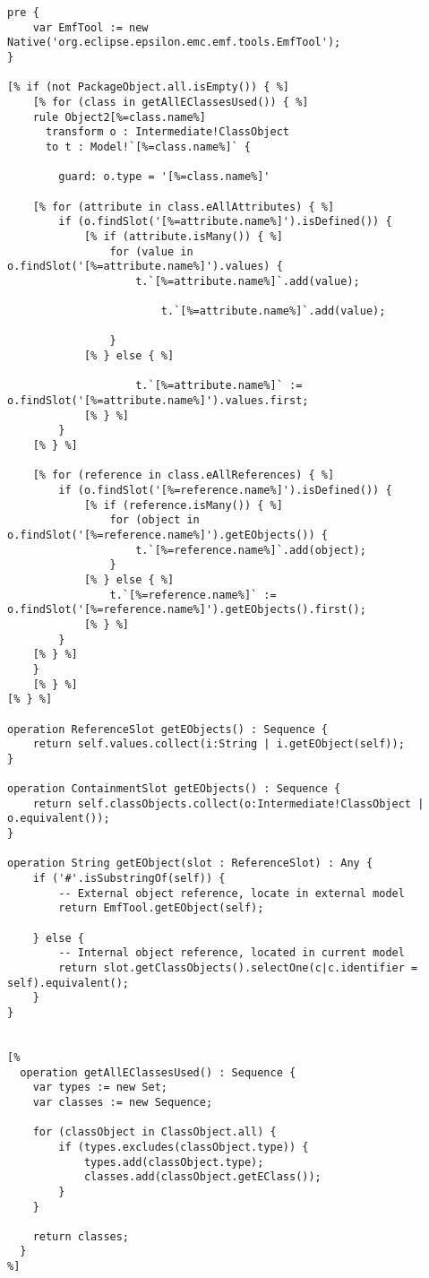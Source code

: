 \begin{lstlisting}[caption=EGL template that generates an intermediate model to target model transformation (in ETL)., label=lst:generate_full, language=EGL]
pre {
	var EmfTool := new Native('org.eclipse.epsilon.emc.emf.tools.EmfTool');
}

[% if (not PackageObject.all.isEmpty()) { %]
	[% for (class in getAllEClassesUsed()) { %]
	rule Object2[%=class.name%]
	  transform o : Intermediate!ClassObject
	  to t : Model!`[%=class.name%]` {
		
		guard: o.type = '[%=class.name%]'
		
	[% for (attribute in class.eAllAttributes) { %]
		if (o.findSlot('[%=attribute.name%]').isDefined()) {
			[% if (attribute.isMany()) { %]
				for (value in o.findSlot('[%=attribute.name%]').values) {
					t.`[%=attribute.name%]`.add(value);

						t.`[%=attribute.name%]`.add(value);

				}
			[% } else { %]

					t.`[%=attribute.name%]` := o.findSlot('[%=attribute.name%]').values.first;
			[% } %]
		}
	[% } %]
	
	[% for (reference in class.eAllReferences) { %]
		if (o.findSlot('[%=reference.name%]').isDefined()) {
			[% if (reference.isMany()) { %]
				for (object in o.findSlot('[%=reference.name%]').getEObjects()) {
					t.`[%=reference.name%]`.add(object);
				}
			[% } else { %]
				t.`[%=reference.name%]` := o.findSlot('[%=reference.name%]').getEObjects().first();
			[% } %]
		}
	[% } %]
	}
	[% } %]
[% } %]

operation ReferenceSlot getEObjects() : Sequence {
	return self.values.collect(i:String | i.getEObject(self));
}

operation ContainmentSlot getEObjects() : Sequence {
	return self.classObjects.collect(o:Intermediate!ClassObject | o.equivalent());
}

operation String getEObject(slot : ReferenceSlot) : Any {
	if ('#'.isSubstringOf(self)) {
		-- External object reference, locate in external model
		return EmfTool.getEObject(self);
	
	} else {
		-- Internal object reference, located in current model
		return slot.getClassObjects().selectOne(c|c.identifier = self).equivalent();
	}
}


[%
  operation getAllEClassesUsed() : Sequence {
	var types := new Set;
	var classes := new Sequence;

	for (classObject in ClassObject.all) {
		if (types.excludes(classObject.type)) {
			types.add(classObject.type);
			classes.add(classObject.getEClass());
		}
	}
	
	return classes;
  }
%]
\end{lstlisting}